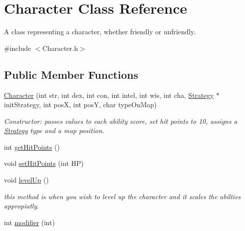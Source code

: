 \hypertarget{classCharacter}{}\section{Character Class Reference}
\label{classCharacter}


A class representing a character, whether friendly or unfriendly.  




{\ttfamily \#include $<$Character.\+h$>$}

\subsection*{Public Member Functions}
\begin{DoxyCompactItemize}
\item 
\hypertarget{classCharacter_a329427ee87720c6f322c85c9e5adee21}{}\label{classCharacter_a329427ee87720c6f322c85c9e5adee21} 
\hyperlink{classCharacter_a329427ee87720c6f322c85c9e5adee21}{Character} (int str, int dex, int con, int intel, int wis, int cha, \hyperlink{classStrategy}{Strategy} $\ast$init\+Strategy, int posX, int posY, char type\+On\+Map)
\begin{DoxyCompactList}\small\item\em Constructor\+: passes values to each ability score, set hit points to 10, assigns a \hyperlink{classStrategy}{Strategy} type and a map position. \end{DoxyCompactList}\item 
int \hyperlink{classCharacter_ac28870a30c9b451f55c3e27adaabfbfa}{get\+Hit\+Points} ()
\item 
void \hyperlink{classCharacter_a549925b3196f1a1b756f2b43df8ab392}{set\+Hit\+Points} (int HP)
\item 
\hypertarget{classCharacter_aaaffb44b62eb70df0e545700c6011210}{}\label{classCharacter_aaaffb44b62eb70df0e545700c6011210} 
void \hyperlink{classCharacter_aaaffb44b62eb70df0e545700c6011210}{level\+Up} ()
\begin{DoxyCompactList}\small\item\em this method is when you wish to level up the character and it scales the abilties appropiatly. \end{DoxyCompactList}\item 
int \hyperlink{classCharacter_a54374ab71aec1bc86805b6f8aa7e7567}{modifier} (int)
\item 
\hypertarget{classCharacter_a18ff2d8cf9264e321e1faff4e8bd0c7c}{}\label{classCharacter_a18ff2d8cf9264e321e1faff4e8bd0c7c} 

\end{DoxyCompactItemize}
